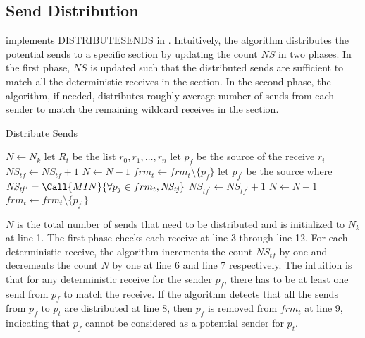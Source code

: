 \subsection{Send Distribution}
 implements $\mathrm{DISTRIBUTESENDS}$ in . Intuitively, the algorithm distributes the potential sends to a specific section by updating the count $\mathit{NS}$ in two phases. In the first phase, $\mathit{NS}$ is updated such that the distributed sends are sufficient to match all the deterministic receives in the section. In the second phase, the algorithm, if needed, distributes roughly average number of sends from each sender to match the remaining wildcard receives in the section. 

\begin{algorithm}
\caption{Distribute Sends}\label{algo:distribute}
\begin{algorithmic}[1]
\State $N\gets N_k$
\State let $R_t$ be the list $r_0,r_1,\ldots,r_n$
\State let $p_{f}$ be the source of the receive $r_i$
\State $\mathit{NS_{tf}}\gets \mathit{NS_{tf}}+1$
\State $N\gets N-1$   
\State $frm_t\gets frm_t\setminus\{p_{f}\}$
\EndIf
\EndIf
\EndFor
\State let $p_{f^\prime}$ be the source where $\mathit{NS_{tf^\prime}}=\Call{MIN}{\forall p_j\in frm_t, \mathit{NS_{tj}}}$
\State $\mathit{NS_{tf^\prime}}\gets \mathit{NS_{tf^\prime}}+1$
\State $N\gets N-1$   
\State $frm_t\gets frm_t\setminus\{p_{f^\prime}\}$
\EndIf
\EndWhile
\end{algorithmic}
\end{algorithm}


$N$ is the total number of sends that need to be distributed and is initialized to $N_k$ at line 1. The first phase checks each receive at line 3 through line 12. For each deterministic receive, the algorithm increments the count $\mathit{NS}_{tf}$ by one and decrements the count $N$ by one at line 6 and line 7 respectively.  
The intuition is that for any deterministic receive for the sender $p_f$, there has to be at least one send from $p_f$ to match the receive. 
If the algorithm detects that all the sends from $p_f$ to $p_t$ are distributed at line 8, then $p_f$ is removed from $frm_t$ at line 9, indicating that $p_f$ cannot be considered as a potential sender for $p_t$. 

